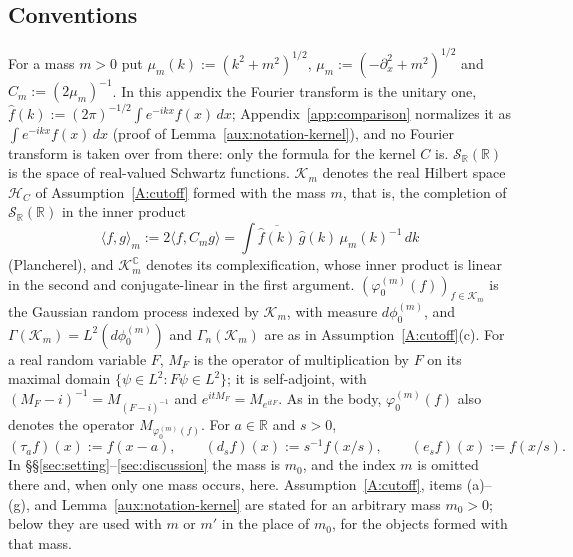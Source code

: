 \documentclass[11pt,a4paper]{article}
\theoremstyle{plain}
\theoremstyle{definition}
\theoremstyle{plain}
\theoremstyle{definition}
\newcommand{\R}{\mathbb{R}}
\newcommand{\C}{\mathbb{C}}
\newcommand{\HH}{\mathcal{H}}
\newcommand{\ip}[2]{\langle #1,#2\rangle}
\begin{document}
\subsection*{Conventions}

For a mass $m>0$ put $\mu_m(k):=(k^2+m^2)^{1/2}$, $\mu_m:=(-\partial_x^2+m^2)^{1/2}$ and
$C_m:=(2\mu_m)^{-1}$.  In this appendix the Fourier transform is the unitary one, $\hat
f(k):=(2\pi)^{-1/2}\int e^{-ikx}f(x)\,dx$; Appendix~\ref{app:comparison} normalizes it as
$\int e^{-ikx}f(x)\,dx$ (proof of Lemma~\ref{aux:notation-kernel}), and no Fourier transform is
taken over from there: only the formula for the kernel $C$ is.
$\mathcal S_\R(\R)$ is the space of real-valued Schwartz functions.  $\mathcal K_m$ denotes the
real Hilbert space $\HH_C$ of Assumption~\ref{A:cutoff} formed with the mass $m$, that is, the
completion of $\mathcal S_\R(\R)$ in the inner product
\[
 \ip fg_m:=2\ip f{C_mg}=\int\overline{\hat f(k)}\,\hat g(k)\,\mu_m(k)^{-1}\,dk
\]
(Plancherel), and $\mathcal K_m^{\C}$ denotes its complexification, whose inner product is
linear in the second and conjugate-linear in the first argument.  $(\varphi_0^{(m)}(f))_{f\in
\mathcal K_m}$ is the Gaussian random process indexed by $\mathcal K_m$, with measure
$d\phi_0^{(m)}$, and $\Gamma(\mathcal K_m)=L^2(d\phi_0^{(m)})$ and $\Gamma_n(\mathcal K_m)$ are
as in Assumption~\ref{A:cutoff}(c).  For a real random variable $F$, $M_F$ is the operator of
multiplication by $F$ on its maximal domain $\{\psi\in L^2:F\psi\in L^2\}$; it is self-adjoint,
with $(M_F-i)^{-1}=M_{(F-i)^{-1}}$ and $e^{itM_F}=M_{e^{itF}}$.  As in the body,
$\varphi_0^{(m)}(f)$ also denotes the operator $M_{\varphi_0^{(m)}(f)}$.  For $a\in\R$ and $s>0$,
\[
 (\tau_af)(x):=f(x-a),\qquad (d_sf)(x):=s^{-1}f(x/s),\qquad (e_sf)(x):=f(x/s) .
\]
In \S\S\ref{sec:setting}--\ref{sec:discussion} the mass is $m_0$, and the index $m$ is omitted
there and, when only one mass occurs, here.  Assumption~\ref{A:cutoff}, items (a)--(g), and
Lemma~\ref{aux:notation-kernel} are stated for an arbitrary mass $m_0>0$; below they are used
with $m$ or $m'$ in the place of $m_0$, for the objects formed with that mass.
\end{document}
